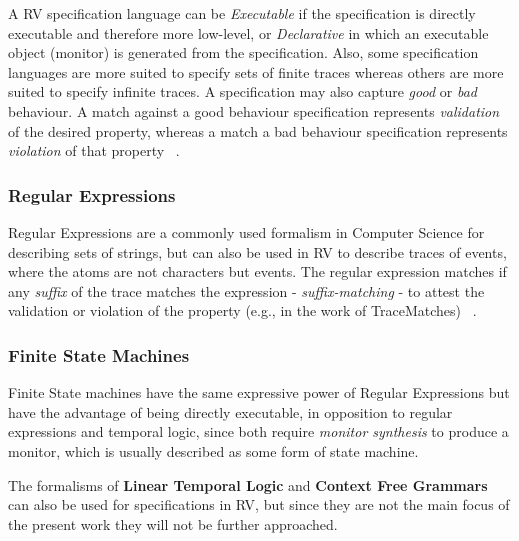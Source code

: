 A RV specification language can be \textit{Executable} if the specification is directly executable and therefore more low-level, or \textit{Declarative} in which an executable object (monitor) is generated from the specification. Also, some specification languages are more suited to specify sets of finite traces whereas others are more suited to specify infinite traces. A specification may also capture \textit{good} or \textit{bad} behaviour. A match against a good behaviour specification represents \textit{validation} of the desired property, whereas a match a bad behaviour specification represents \textit{violation} of that property ~\cite{rv2}.

\subsubsection{Regular Expressions}
Regular Expressions are a commonly used formalism in Computer Science for describing sets of strings, but can also be used in RV to describe traces of events, where the atoms are not characters but events. The regular expression matches if any \textit{suffix} of the trace matches the expression - \textit{suffix-matching} - to attest the validation or violation of the property (e.g., in the work of TraceMatches) ~\cite{rvart}.

\subsubsection{Finite State Machines}
Finite State machines have the same expressive power of Regular Expressions but have the advantage of being directly executable, in opposition to regular expressions and temporal logic, since both require \textit{monitor synthesis} to produce a monitor, which is usually described as some form of state machine. 

\vspace{5mm}

The formalisms of \textbf{Linear Temporal Logic} and \textbf{Context Free Grammars} can also be used for specifications in RV, but since they are not the main focus of the present work they will not be further approached. 
